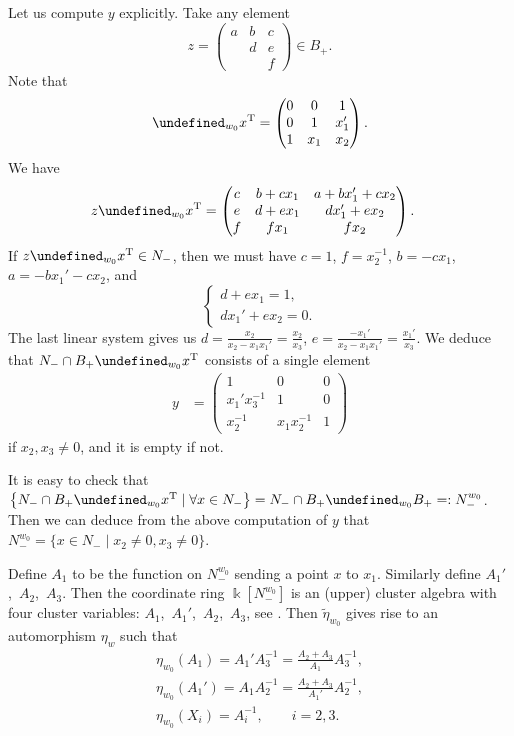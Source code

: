 \documentclass[10pt,a4paper]{amsart}
\newcommand{\kk}{\Bbbk}
\renewcommand{\tilde}[1]{\widetilde{#1}}
\newcommand{\opname}[1]{\operatorname{\mathsf{#1}}}
\let\trans\undefined
\newcommand{\trans}{\opname{P}}
\numberwithin{equation}{section}
\begin{document}
\begin{Example}
Let us compute $y$ explicitly. Take any element \[z=\begin{pmatrix}
a & b & c\\
 & d & e\\
 & & f
\end{pmatrix}\in B_{+}.\] Note that \[\trans_{w_{0}}x^{\rm T}=\begin{pmatrix}
0 & 0 & 1\\
0 & 1 & x_{1}'\\
1 & x_{1} & x_{2}
\end{pmatrix}.\] We have
\begin{align*}
z\trans_{w_{0}}x^{\rm T} & =\begin{pmatrix}
c & b+cx_{1} & a+bx_{1}'+cx_{2}\\
e & d+ex_{1} & dx_{1}'+ex_{2}\\
f & fx_{1} & fx_{2}
\end{pmatrix}.
\end{align*}
If $z\trans_{w_{0}}x^{\rm T}\in N_{-}$, then we must have $c=1$, $f=x_{2}^{-1}$,
$b=-cx_{1}$, $a=-bx_{1}'-cx_{2}$, and \[\begin{cases}
d+ex_{1} =1,\\
dx_{1}'+ex_{2} =0.
\end{cases} \] The last linear system gives us $d=\frac{x_{2}}{x_{2}-x_{1}x_{1}'}=\frac{x_{2}}{x_{3}}$,
$e=\frac{-x_{1}'}{x_{2}-x_{1}x_{1}'}=\frac{x_{1}'}{x_{3}}$. We deduce
that $N_{-}\cap B_{+}\trans_{w_{0}}x^{\rm T}$ consists of a single element
\begin{align*}
y & =\begin{pmatrix}
1 & 0 & 0\\
x_{1}'x_{3}^{-1} & 1 & 0\\
x_{2}^{-1} & x_{1}x_{2}^{-1} & 1
\end{pmatrix}
\end{align*}
if $x_{2},x_{3}\neq0$, and it is empty if not.

It is easy to check that $\big\{N_{-}\cap B_{+}\trans_{w_{0}}x^{\rm T}\mid \forall x\in N_{-}\big\}=N_{-}\cap B_{+}\trans_{w_{0}}B_{+}=:N_{-}^{w_{0}}$.
Then we can deduce from the above computation of $y$ that $N_{-}^{w_{0}}=\{x\in N_{-}\mid x_{2}\neq0,x_{3}\neq0\}$.

Define $A_{1}$ to be the function on $N_{-}^{w_{0}}$ sending a point
$x$ to $x_{1}$. Similarly define $A_{1}'$,~$A_{2}$,~$A_{3}$.
Then the coordinate ring $\kk[N_{-}^{w_{0}}]$ is an (upper) cluster
algebra with four cluster variables: $A_{1}$,~$A_{1}'$,~$A_{2}$,~$A_{3}$, see \cite[Example~2.2]{qin2021cluster}. Then $\tilde{\eta}_{w_{0}}$
gives rise to an automorphism $\eta_{w}$ such that
\begin{gather*}
\eta_{w_{0}}(A_{1}) =A_{1}'A_{3}^{-1}=\frac{A_{2}+A_{3}}{A_{1}}A_{3}^{-1},\\
\eta_{w_{0}}(A_{1}') =A_{1}A_{2}^{-1}=\frac{A_{2}+A_{3}}{A_{1}'}A_{2}^{-1},\\
\eta_{w_{0}}(X_{i}) =A_{i}^{-1},\qquad i=2,3.
\end{gather*}
\end{Example}
\end{document}

